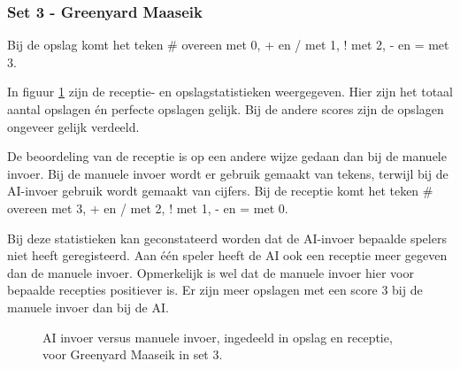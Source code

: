 \subsubsection{Set 3 - Greenyard Maaseik}
\label{sec:PL3_Greenyard3}
Bij de opslag komt het teken \# overeen met 0, + en / met 1, ! met 2, - en = met 3.

In figuur \ref{fig:PL3ServeMaaseik3} zijn de receptie- en opslagstatistieken weergegeven. Hier zijn het totaal aantal opslagen én perfecte opslagen gelijk. Bij de andere scores zijn de opslagen ongeveer gelijk verdeeld.

De beoordeling van de receptie is op een andere wijze gedaan dan bij de manuele invoer. Bij de manuele invoer wordt er gebruik gemaakt van tekens, terwijl bij de AI-invoer gebruik wordt gemaakt van cijfers. Bij de receptie komt het teken \# overeen met 3, + en / met 2, ! met 1, - en = met 0.

Bij deze statistieken kan geconstateerd worden dat de AI-invoer bepaalde spelers niet heeft geregisteerd. Aan één speler heeft de AI ook een receptie meer gegeven dan de manuele invoer. Opmerkelijk is wel dat de manuele invoer hier voor bepaalde recepties positiever is. Er zijn meer opslagen met een score 3 bij de manuele invoer dan bij de AI.

\begin{figure}[ht]
\centering
{}
\caption{AI invoer versus manuele invoer, ingedeeld in opslag en receptie, voor Greenyard Maaseik in set 3.}
\label{fig:PL3ServeMaaseik3}
\end{figure}

